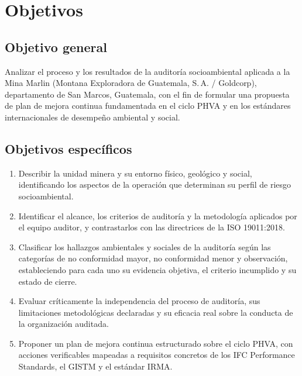 %

\section{Objetivos}
\label{sec:objetivos}

\subsection{Objetivo general}

Analizar el proceso y los resultados de la auditoría socioambiental aplicada a la
Mina Marlin (Montana Exploradora de Guatemala, S.\,A. / Goldcorp), departamento de
San Marcos, Guatemala, con el fin de formular una propuesta de plan de mejora
continua fundamentada en el ciclo PHVA y en los estándares internacionales de
desempeño ambiental y social.

\subsection{Objetivos específicos}

\begin{enumerate}
  \item Describir la unidad minera y su entorno físico, geológico y social,
        identificando los aspectos de la operación que determinan su perfil de
        riesgo socioambiental.
  \item Identificar el alcance, los criterios de auditoría y la metodología
        aplicados por el equipo auditor, y contrastarlos con las directrices de la
        ISO 19011:2018.
  \item Clasificar los hallazgos ambientales y sociales de la auditoría según las
        categorías de no conformidad mayor, no conformidad menor y observación,
        estableciendo para cada uno su evidencia objetiva, el criterio incumplido
        y su estado de cierre.
  \item Evaluar críticamente la independencia del proceso de auditoría, sus
        limitaciones metodológicas declaradas y su eficacia real sobre la conducta
        de la organización auditada.
  \item Proponer un plan de mejora continua estructurado sobre el ciclo PHVA, con
        acciones verificables mapeadas a requisitos concretos de los IFC
        Performance Standards, el GISTM y el estándar IRMA.
\end{enumerate}
